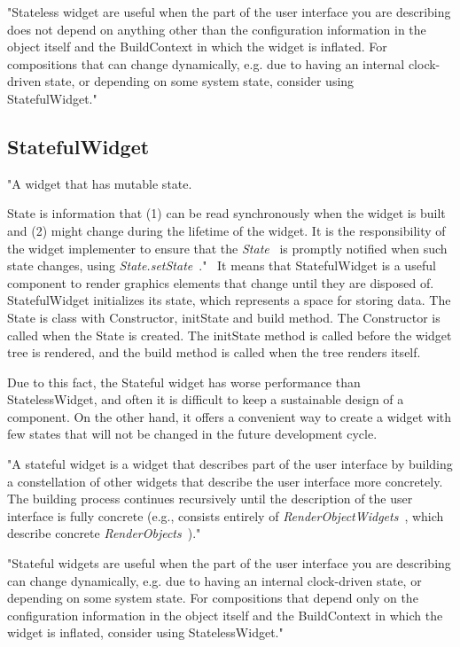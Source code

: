 "Stateless widget are useful when the part of the user interface you are describing does not depend on anything other than the configuration information in the object itself and the BuildContext in which the widget is inflated.
For compositions that can change dynamically, e.g. due to having an internal clock-driven state, or depending on some system state, consider using StatefulWidget."~\cite{statelessWidget}


\subsection{StatefulWidget}\label{subsec:statefulwidget}
"A widget that has mutable state.

State is information that (1) can be read synchronously when the widget is built and (2) might change during the lifetime of the widget.
It is the responsibility of the widget implementer to ensure that the \textit{State}~\cite{state} is promptly notified when such state changes, using \textit{State.setState}~\cite{setState}."~\cite{statefulWidget}
It means that StatefulWidget is a useful component to render graphics elements that change until they are disposed of.
StatefulWidget initializes its state, which represents a space for storing data.
The State is class with Constructor, initState and build method.
The Constructor is called when the State is created.
The initState method is called before the widget tree is rendered, and the build method is called when the tree renders itself.

Due to this fact, the Stateful widget has worse performance than StatelessWidget, and often it is difficult to keep a sustainable design of a component.
On the other hand, it offers a convenient way to create a widget with few states that will not be changed in the future development cycle.

"A stateful widget is a widget that describes part of the user interface by building a constellation of other widgets that describe the user interface more concretely.
The building process continues recursively until the description of the user interface is fully concrete (e.g., consists entirely of
\textit{RenderObjectWidgets}~\cite{renderObjectWidget}, which describe concrete \textit{RenderObjects}~\cite{renderObject})."~\cite{statefulWidget}


"Stateful widgets are useful when the part of the user interface you are describing can change dynamically, e.g. due to having an internal clock-driven state, or depending on some system state.
For compositions that depend only on the configuration information in the object itself and the BuildContext in which the widget is inflated, consider using StatelessWidget."~\cite{statefulWidget}


